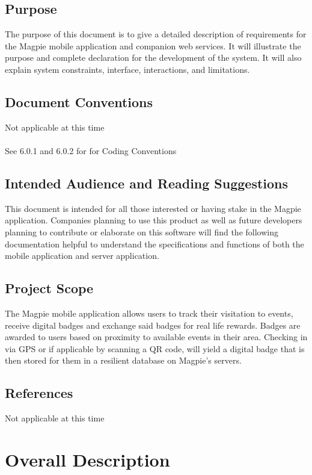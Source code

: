 \documentclass{scrreprt}
\begin{document}
\section{Purpose}
The purpose of this document is to give a detailed description of requirements for
the Magpie mobile application and companion web services. It will illustrate the purpose
and complete declaration for the development of the system.  It will also explain system
constraints, interface, interactions, and limitations.

\section{Document Conventions}
Not applicable at this time \\ \\
See 6.0.1 and 6.0.2 for for Coding Conventions

\section{Intended Audience and Reading Suggestions}
This document is intended for all those interested or having stake in the Magpie
application.  Companies planning to use this product as well as future developers
planning to contribute or elaborate on this software will find the following documentation
helpful to understand the specifications and functions of both the mobile application and server application.

\section{Project Scope}
The Magpie mobile application allows users to track their visitation to events,
receive digital badges and exchange said badges for real life rewards. Badges are awarded
to users based on proximity to available events in their area.  Checking in via GPS or
if applicable by scanning a QR code, will yield a digital badge that is then stored for them in a resilient database on Magpie's servers.

\section{References}
Not applicable at this time

\chapter{Overall Description}
\end{document}
